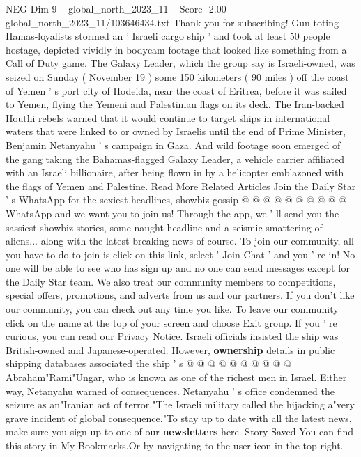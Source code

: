 \begin{textsample}{NEG Dim 9 – global\_north\_2023\_11 – Score -2.00 – global\_north\_2023\_11/103646434.txt}  \label{ex:f9_neg_304}
Thank you for subscribing!
Gun-toting Hamas-loyalists stormed an ' Israeli cargo ship ' and took at least 50 people hostage, depicted vividly in bodycam footage that looked like something from a Call of Duty game.
The Galaxy Leader, which the group say is Israeli-owned, was seized on Sunday ( November 19 ) some 150 kilometers ( 90 miles ) off the coast of Yemen ' s port city of Hodeida, near the coast of Eritrea, before it was sailed to Yemen, flying the Yemeni and Palestinian flags on its deck.
The Iran-backed Houthi rebels warned that it would continue to target ships in international waters that were linked to or owned by Israelis until the end of Prime Minister, Benjamin Netanyahu ' s campaign in Gaza.
And wild footage soon emerged of the gang taking the Bahamas-flagged Galaxy Leader, a vehicle carrier affiliated with an Israeli billionaire, after being flown in by a helicopter emblazoned with the flags of Yemen and Palestine.
Read More Related Articles Join the Daily Star ' s WhatsApp for the sexiest headlines, showbiz gossip @ @ @ @ @ @ @ @ @ @ WhatsApp and we want you to join us!
Through the app, we ' ll send you the sassiest showbiz stories, some naught headline and a seismic smattering of aliens... along with the latest breaking news of course.
To join our community, all you have to do to join is click on this link, select ' Join Chat ' and you ' re in!
No one will be able to see who has sign up and no one can send messages except for the Daily Star team.
We also treat our community members to competitions, special offers, promotions, and adverts from us and our partners.
If you don't like our community, you can check out any time you like.
To leave our community click on the name at the top of your screen and choose Exit group.
If you ' re curious, you can read our Privacy Notice.
Israeli officials insisted the ship was British-owned and Japanese-operated.
However, \textbf{ownership} details in public shipping databases associated the ship ' s @ @ @ @ @ @ @ @ @ @ Abraham"Rami"Ungar, who is known as one of the richest men in Israel.
Either way, Netanyahu warned of consequences.
Netanyahu ' s office condemned the seizure as an"Iranian act of terror."The Israeli military called the hijacking a"very grave incident of global consequence."To stay up to date with all the latest news, make sure you sign up to one of our \textbf{newsletters} here.
Story Saved You can find this story in My Bookmarks.Or by navigating to the user icon in the top right.

\end{textsample}
